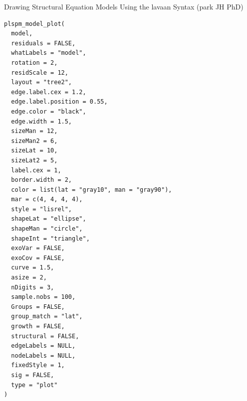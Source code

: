 \documentclass[a4paper]{book}
\begin{document}
%
\begin{Description}
Drawing Structural Equation Models Using the lavaan Syntax (park JH PhD)
\end{Description}
%
\begin{Usage}
\begin{verbatim}
plspm_model_plot(
  model,
  residuals = FALSE,
  whatLabels = "model",
  rotation = 2,
  residScale = 12,
  layout = "tree2",
  edge.label.cex = 1.2,
  edge.label.position = 0.55,
  edge.color = "black",
  edge.width = 1.5,
  sizeMan = 12,
  sizeMan2 = 6,
  sizeLat = 10,
  sizeLat2 = 5,
  label.cex = 1,
  border.width = 2,
  color = list(lat = "gray10", man = "gray90"),
  mar = c(4, 4, 4, 4),
  style = "lisrel",
  shapeLat = "ellipse",
  shapeMan = "circle",
  shapeInt = "triangle",
  exoVar = FALSE,
  exoCov = FALSE,
  curve = 1.5,
  asize = 2,
  nDigits = 3,
  sample.nobs = 100,
  Groups = FALSE,
  group_match = "lat",
  growth = FALSE,
  structural = FALSE,
  edgeLabels = NULL,
  nodeLabels = NULL,
  fixedStyle = 1,
  sig = FALSE,
  type = "plot"
)
\end{verbatim}
\end{Usage}
%
\end{document}

